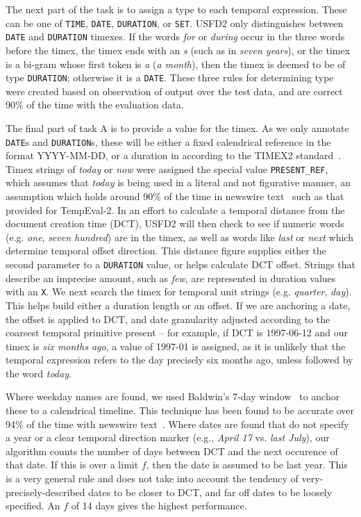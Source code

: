 \documentclass[11pt]{article}
\begin{document}
The next part of the task is to assign a type to each temporal expression. These can be one of {\tt TIME}, {\tt DATE}, {\tt DURATION}, or {\tt SET}. USFD2 only distinguishes between {\tt DATE} and {\tt DURATION} timexes. If the words \emph{for} or \emph{during} occur in the three words before the timex, the timex ends with an {\emph s} (such as in \emph{seven years}), or the timex is a bi-gram whose first token is {\emph a} (\emph{a month}), then the timex is deemed to be of type {\tt DURATION}; otherwise it is a {\tt DATE}. These three rules for determining type were created based on observation of output over the test data, and are correct 90\% of the time with the evaluation data.

The final part of task A is to provide a value for the timex. As we only annotate {\tt DATE}s and {\tt DURATION}s, these will be either a fixed calendrical reference in the format YYYY-MM-DD, or a duration in according to the TIMEX2 standard~\cite{ferro2005tides}. Timex strings of \emph{today} or \emph{now} were assigned the special value {\tt PRESENT\_REF}, which assumes that \emph{today} is being used in a literal and not figurative manner, an assumption which holds around 90\% of the time in newswire text~\cite{ahn2005towards} such as that provided for TempEval-2. In an effort to calculate a temporal distance from the document creation time (DCT), USFD2 will then check to see if numeric words (e.g. \emph{one}, \emph{seven hundred}) are in the timex, as well as words like \emph{last} or \emph{next} which determine temporal offset direction. This distance figure supplies either the second parameter to a {\tt DURATION} value, or helps calculate DCT offset. Strings that describe an imprecise amount, such as \emph{few}, are represented in duration values with an {\tt X}. We next search the timex for temporal unit strings (e.g. \emph{quarter}, \emph{day}). This helps build either a duration length or an offset. If we are anchoring a date, the offset is applied to DCT, and date granularity adjusted according to the coarsest temporal primitive present -- for example, if DCT is 1997-06-12 and our timex is \emph{six months ago}, a value of 1997-01 is assigned, as it is unlikely that the temporal expression refers to the day precisely six months ago, unless followed by the word \emph{today}.

Where weekday names are found, we used Baldwin's 7-day window~\cite{baldwin2002learning} to anchor these to a calendrical timeline. This technique has been found to be accurate over 94\% of the time with newswire text~\cite{mazur2008s}. Where dates are found that do not specify a year or a clear temporal direction marker (e.g., \emph{April 17} vs. \emph{last July}), our algorithm counts the number of days between DCT and the next occurence of that date. If this is over a limit $f$, then the date is assumed to be last year. This is a very general rule and does not take into account the tendency of very-precisely-described dates to be closer to DCT, and far off dates to be loosely specified. An $f$ of 14 days gives the highest performance.
\end{document}
